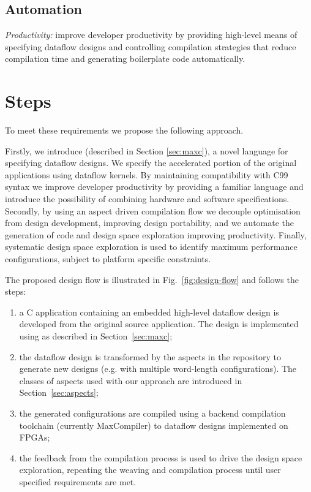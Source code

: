 \subsection{Automation}
\emph{Productivity:} improve developer productivity by providing
high-level means of specifying dataflow designs and controlling
compilation strategies that reduce compilation time and generating
boilerplate code automatically.


\section{Steps}

To meet these requirements we propose the following approach.

Firstly, we introduce \FAST{} (described in Section \ref{sec:maxc}), a
novel language for specifying dataflow designs. We specify the
accelerated portion of the original applications using \FAST{}
dataflow kernels. By maintaining compatibility with C99 syntax we
improve developer productivity by providing a familiar language and
introduce the possibility of combining hardware and software
specifications. Secondly, by using an aspect driven compilation flow
we decouple optimisation from design development, improving design
portability, and we automate the generation of code and design space
exploration improving productivity. Finally, systematic design space
exploration is used to identify maximum performance configurations,
subject to platform specific constraints.

The proposed design flow is illustrated in Fig.~\ref{fig:design-flow}
and follows the steps:
\begin{enumerate}
\item a C application containing an embedded high-level dataflow
  design is developed from the original source application. The design
  is implemented using \FAST{} as described in Section~\ref{sec:maxc};
\item the dataflow design is transformed by the aspects in the
  repository to generate new designs (e.g. with multiple word-length
  configurations). The classes of aspects used with our approach are
  introduced in Section~\ref{sec:aspects};
\item the generated configurations are compiled using a backend
  compilation toolchain (currently MaxCompiler) to dataflow designs
  implemented on FPGAs;
\item the feedback from the compilation process is used to drive the
  design space exploration, repeating the weaving and compilation
  process until user specified requirements are met.
\end{enumerate}


